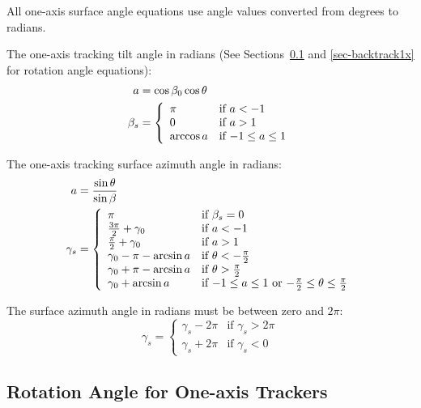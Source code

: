 \documentclass[12pt,letterpaper]{article}
\begin{document}
All one-axis surface angle equations use angle values converted from degrees to radians.

The one-axis tracking tilt angle in radians (See Sections~\ref{sec-rot1x} and \ref{sec-backtrack1x} for rotation angle equations):
\begin{align}
a & = \cos\beta_0 \cos\theta\notag\\
\beta_s &= \left\{
\begin{array}{ll}
\pi & \text{if $a<-1$}\\
0 & \text{if $a>1$}\\
\arccos a & \text{if $-1 \leq a \leq 1$}
\end{array}
\right.
\end{align}

The one-axis tracking surface azimuth angle in radians:
\begin{align}
a & = \frac{\sin\theta}{\sin\beta}\notag\\
\gamma_s &= \left\{
\begin{array}{ll}
\pi & \text{if $\beta_s=0$}\\
\frac{3\pi}{2} + \gamma_0 & \text{if $a<-1$}\\
\frac{\pi}{2} + \gamma_0 & \text{if $a>1$}\\
\gamma_0 - \pi - \arcsin{a} & \text{if $\theta < -\frac{\pi}{2}$}\\
\gamma_0 + \pi - \arcsin{a} & \text{if $\theta > \frac{\pi}{2}$}\\
\gamma_0 + \arcsin{a} & \text{if $-1 \leq a \leq 1$ or $-\frac{\pi}{2} \leq \theta \leq \frac{\pi}{2}$}
\end{array}
\right.
\end{align}

The surface azimuth angle in radians must be between zero and $2\pi$:
\begin{equation}
\gamma_s = \left\{
\begin{array}{ll}
\gamma_s - 2\pi & \text{if $\gamma_s > 2\pi$}\\
\gamma_s + 2\pi & \text{if $\gamma_s < 0$}
\end{array}
\right.
\end{equation}

\subsection{Rotation Angle for One-axis Trackers}\label{sec-rot1x}
\end{document}
